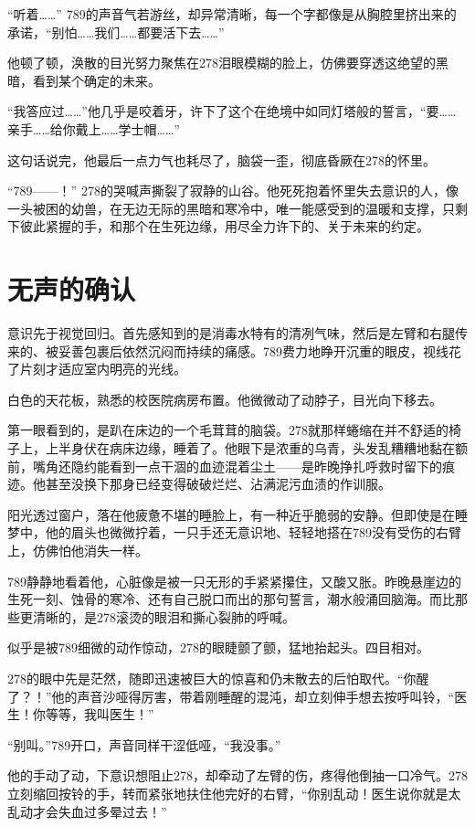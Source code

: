\documentclass[a4paper]{book}
\begin{document}
“听着……” 789的声音气若游丝，却异常清晰，每一个字都像是从胸腔里挤出来的承诺，“别怕……我们……都要活下去……”

他顿了顿，涣散的目光努力聚焦在278泪眼模糊的脸上，仿佛要穿透这绝望的黑暗，看到某个确定的未来。

“我答应过……”他几乎是咬着牙，许下了这个在绝境中如同灯塔般的誓言，“要……亲手……给你戴上……学士帽……”

这句话说完，他最后一点力气也耗尽了，脑袋一歪，彻底昏厥在278的怀里。

“789——！” 278的哭喊声撕裂了寂静的山谷。他死死抱着怀里失去意识的人，像一头被困的幼兽，在无边无际的黑暗和寒冷中，唯一能感受到的温暖和支撑，只剩下彼此紧握的手，和那个在生死边缘，用尽全力许下的、关于未来的约定。
\normalsize
\section{无声的确认}
\songti{}
意识先于视觉回归。首先感知到的是消毒水特有的清冽气味，然后是左臂和右腿传来的、被妥善包裹后依然沉闷而持续的痛感。789费力地睁开沉重的眼皮，视线花了片刻才适应室内明亮的光线。

白色的天花板，熟悉的校医院病房布置。他微微动了动脖子，目光向下移去。

第一眼看到的，是趴在床边的一个毛茸茸的脑袋。278就那样蜷缩在并不舒适的椅子上，上半身伏在病床边缘，睡着了。他眼下是浓重的乌青，头发乱糟糟地黏在额前，嘴角还隐约能看到一点干涸的血迹混着尘土——是昨晚挣扎呼救时留下的痕迹。他甚至没换下那身已经变得破破烂烂、沾满泥污血渍的作训服。

阳光透过窗户，落在他疲惫不堪的睡脸上，有一种近乎脆弱的安静。但即使是在睡梦中，他的眉头也微微拧着，一只手还无意识地、轻轻地搭在789没有受伤的右臂上，仿佛怕他消失一样。

789静静地看着他，心脏像是被一只无形的手紧紧攥住，又酸又胀。昨晚悬崖边的生死一刻、蚀骨的寒冷、还有自己脱口而出的那句誓言，潮水般涌回脑海。而比那些更清晰的，是278滚烫的眼泪和撕心裂肺的呼喊。

似乎是被789细微的动作惊动，278的眼睫颤了颤，猛地抬起头。四目相对。

278的眼中先是茫然，随即迅速被巨大的惊喜和仍未散去的后怕取代。“你醒了？！”他的声音沙哑得厉害，带着刚睡醒的混沌，却立刻伸手想去按呼叫铃，“医生！你等等，我叫医生！”

“别叫。”789开口，声音同样干涩低哑，“我没事。”

他的手动了动，下意识想阻止278，却牵动了左臂的伤，疼得他倒抽一口冷气。278立刻缩回按铃的手，转而紧张地扶住他完好的右臂，“你别乱动！医生说你就是太乱动才会失血过多晕过去！”
\end{document}
